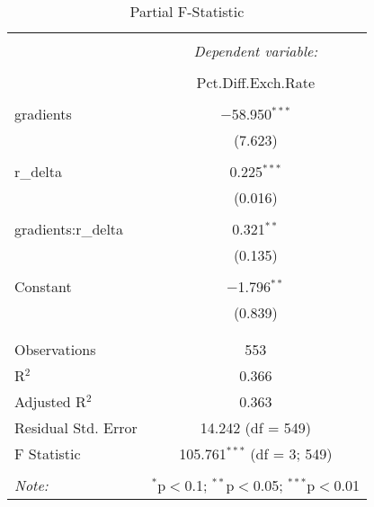 
\begin{table}[!htbp] \centering 
  \caption{Partial F-Statistic} 
  \label{tab:partial} 
\begin{tabular}{@{\extracolsep{5pt}}lc} 
\\[-1.8ex]\hline 
\hline \\[-1.8ex] 
 & \multicolumn{1}{c}{\textit{Dependent variable:}} \\ 
\cline{2-2} 
\\[-1.8ex] & Pct.Diff.Exch.Rate \\ 
\hline \\[-1.8ex] 
 gradients & $-$58.950$^{***}$ \\ 
  & (7.623) \\ 
  & \\ 
 r\_delta & 0.225$^{***}$ \\ 
  & (0.016) \\ 
  & \\ 
 gradients:r\_delta & 0.321$^{**}$ \\ 
  & (0.135) \\ 
  & \\ 
 Constant & $-$1.796$^{**}$ \\ 
  & (0.839) \\ 
  & \\ 
\hline \\[-1.8ex] 
Observations & 553 \\ 
R$^{2}$ & 0.366 \\ 
Adjusted R$^{2}$ & 0.363 \\ 
Residual Std. Error & 14.242 (df = 549) \\ 
F Statistic & 105.761$^{***}$ (df = 3; 549) \\ 
\hline 
\hline \\[-1.8ex] 
\textit{Note:}  & \multicolumn{1}{r}{$^{*}$p$<$0.1; $^{**}$p$<$0.05; $^{***}$p$<$0.01} \\ 
\end{tabular} 
\end{table} 
